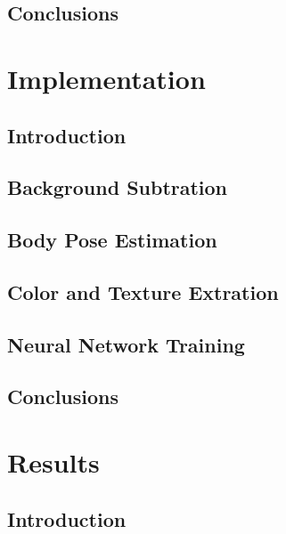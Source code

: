 \documentclass[titlepage,12pt,a4paper,times]{book}
\begin{document}
\section{Conclusions}
\label{chap2:sec:concs}

\chapter{Implementation}
\label{chap:imp}

\section{Introduction}
\label{chap3:sec:intro}

\section{Background Subtration}
\label{chap3:sec:bs}

\section{Body Pose Estimation}
\label{chap3:sec:bps}

\section{Color and Texture Extration}
\label{chap3:sec:cte}

\section{Neural Network Training}
\label{chap3:sec:nnt}

\section{Conclusions}
\label{chap3:sec:concs}

\chapter{Results}
\label{chap:res}

\section{Introduction}
\label{chap4:sec:intro}

\section{}
\label{chap4:sec:...}
\end{document}
